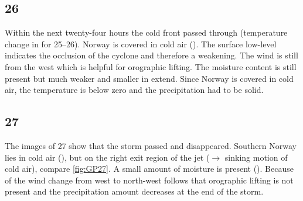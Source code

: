 \subsection*{\SI{26}{\dec}}
\noindent Within the next twenty-four hours the cold front passed through (temperature change in  for \SIrange{25}{26}{\dec}). Norway is covered in cold air (). The surface low-level indicates the occlusion of the cyclone and therefore a weakening. The wind is still from the west which is helpful for orographic lifting. The moisture content is still present but much weaker and smaller in extend. Since Norway is covered in cold air, the temperature is below zero and the precipitation had to be solid. 

\subsection*{\SI{27}{\dec}}
\noindent
The images of \SI{27}{\dec} show that the storm passed and disappeared. Southern Norway lies in cold air (), but on the right exit region of the jet ($\rightarrow$ sinking motion of cold air), compare \ref{fig:GP27}. A small amount of moisture is present (). Because of the wind change from west to north-west follows that orographic lifting is not present and the precipitation amount decreases at the end of the storm. 



